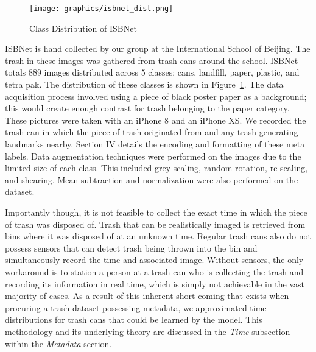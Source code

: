 \documentclass[conference]{ieeeconf}
\begin{document}
\begin{figure}[h]
  \texttt{[image: graphics/isbnet\_dist.png]}
  \caption{Class Distribution of ISBNet}
  \label{fig:isbNetClassDist}
\end{figure}
ISBNet is hand collected by our group at the International School of Beijing. The trash in these images was gathered from trash cans around the school. ISBNet totals 889 images distributed across 5 classes: cans, landfill, paper, plastic, and tetra pak. The distribution of these classes is shown in Figure~\ref{fig:isbNetClassDist}. The data acquisition process involved using a piece of black poster paper as a background; this would create enough contrast for trash belonging to the paper category. These pictures were taken with an iPhone 8 and an iPhone XS. We recorded the trash can in which the piece of trash originated from and any trash-generating landmarks nearby. Section IV details the encoding and formatting of these meta labels. Data augmentation techniques were performed on the images due to the limited size of each class. This included grey-scaling, random rotation, re-scaling, and shearing. Mean subtraction and normalization were also performed on the dataset. 

Importantly though, it is not feasible to collect the exact time in which the piece of trash was disposed of. Trash that can be realistically imaged is retrieved from bins where it was disposed of at an unknown time. Regular trash cans also do not possess sensors that can detect trash being thrown into the bin and simultaneously record the time and associated image. Without sensors, the only workaround is to station a person at a trash can who is collecting the trash and recording its information in real time, which is simply not achievable in the vast majority of cases. As a result of this inherent short-coming that exists when procuring a trash dataset possessing metadata, we approximated time distributions for trash cans that could be learned by the model. This methodology and its underlying theory are discussed in the \emph{Time} subsection within the \emph{Metadata} section.

\end{document}
